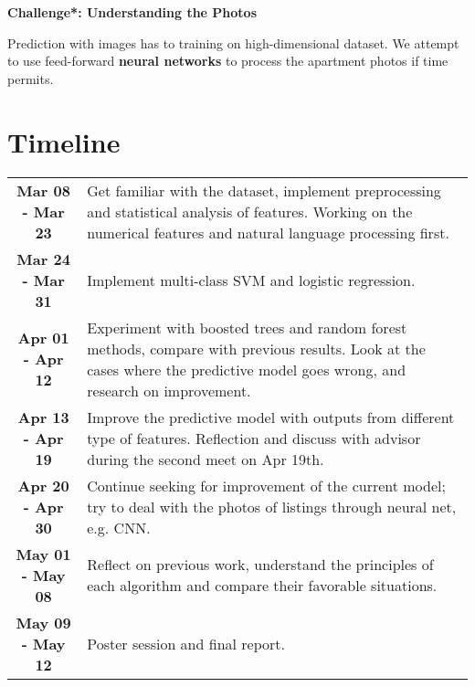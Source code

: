 \documentclass{article}
\begin{document}
\noindent\textbf{\large Challenge*: Understanding the Photos} 

Prediction with images has to training on high-dimensional dataset. We attempt to use feed-forward \textbf{neural networks} to process the apartment photos if time permits. 
 

\section{Timeline} 

\begin{tabular}{cp{33.5em}}
\textbf{Mar 08 - Mar 23} & Get familiar with the dataset, implement preprocessing and statistical analysis of features. Working on the numerical features and natural language processing first. \\
\textbf{Mar 24 - Mar 31} & Implement multi-class SVM and logistic regression. \\
\textbf{Apr 01 - Apr 12} &  Experiment with boosted trees and random forest methods, compare with previous results. Look at the cases where the predictive model goes wrong, and research on improvement. \\
\textbf{Apr 13 - Apr 19} & Improve the predictive model with outputs from different type of features. Reflection and discuss with advisor during the second meet on Apr 19th.\\
\textbf{Apr 20 - Apr 30} & Continue seeking for improvement of the current model; try to deal with the photos of listings through neural net, e.g. CNN. \\
\textbf{May 01 - May 08} & Reflect on previous work, understand the principles of each algorithm and compare their favorable situations.\\
\textbf{May 09 - May 12} & Poster session and final report. \\
\end{tabular}
\end{document}
